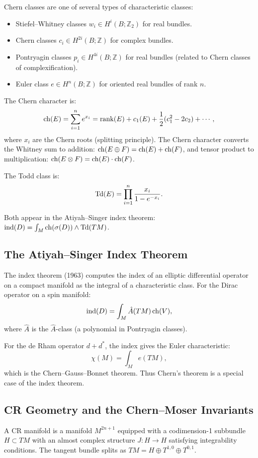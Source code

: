 Chern classes are one of several types of characteristic classes:
\begin{itemize}
    \item Stiefel--Whitney classes $w_i \in H^i(B; \mathbb{Z}_2)$ for real bundles.
    \item Chern classes $c_i \in H^{2i}(B; \mathbb{Z})$ for complex bundles.
    \item Pontryagin classes $p_i \in H^{4i}(B; \mathbb{Z})$ for real bundles (related to Chern classes of complexification).
    \item Euler class $e \in H^n(B; \mathbb{Z})$ for oriented real bundles of rank $n$.
\end{itemize}

The Chern character is:
\[
\operatorname{ch}(E) = \sum_{i=1}^n e^{x_i} = \rank(E) + c_1(E) + \frac{1}{2}(c_1^2 - 2c_2) + \cdots,
\]
where $x_i$ are the Chern roots (splitting principle). The Chern character converts the Whitney sum to addition: $\operatorname{ch}(E \oplus F) = \operatorname{ch}(E) + \operatorname{ch}(F)$, and tensor product to multiplication: $\operatorname{ch}(E \otimes F) = \operatorname{ch}(E) \cdot \operatorname{ch}(F)$.

The Todd class is:
\[
\operatorname{Td}(E) = \prod_{i=1}^n \frac{x_i}{1 - e^{-x_i}}.
\]

Both appear in the Atiyah--Singer index theorem: $\operatorname{ind}(D) = \int_M \operatorname{ch}(\sigma(D)) \wedge \operatorname{Td}(TM)$.

\subsection{The Atiyah--Singer Index Theorem}

The index theorem (1963) computes the index of an elliptic differential operator on a compact manifold as the integral of a characteristic class. For the Dirac operator on a spin manifold:
\[
\operatorname{ind}(D) = \int_M \hat{A}(TM) \operatorname{ch}(V),
\]
where $\hat{A}$ is the $\hat{A}$-class (a polynomial in Pontryagin classes).

For the de Rham operator $d + d^*$, the index gives the Euler characteristic:
\[
\chi(M) = \int_M e(TM),
\]
which is the Chern--Gauss--Bonnet theorem. Thus Chern's theorem is a special case of the index theorem.

\subsection{CR Geometry and the Chern--Moser Invariants}

A CR manifold is a manifold $M^{2n+1}$ equipped with a codimension-1 subbundle $H \subset TM$ with an almost complex structure $J: H \to H$ satisfying integrability conditions. The tangent bundle splits as $TM = H \oplus T^{1,0} \oplus T^{0,1}$.

